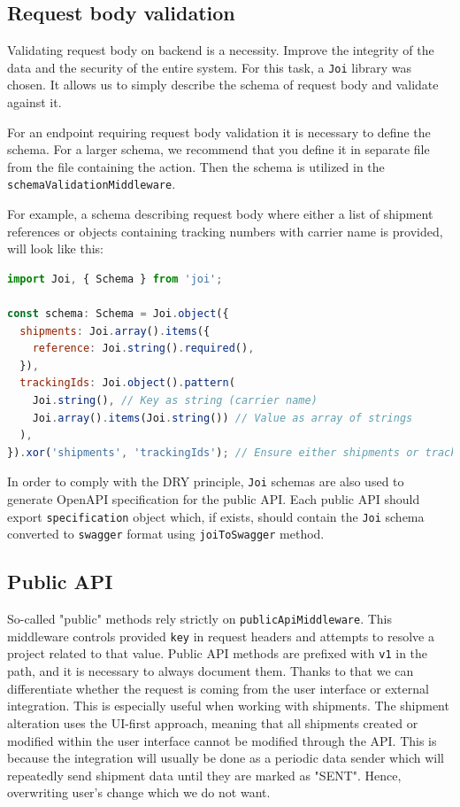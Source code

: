 \subsection{Request body validation}
Validating request body on backend is a necessity.
Improve the integrity of the data and the security of the entire system.
For this task, a \texttt{Joi} library was chosen.
It allows us to simply describe the schema of request body and validate against it.

For an endpoint requiring request body validation it is necessary to define the schema.
For a larger schema, we recommend that you define it in separate file from the file containing the action. 
Then the schema is utilized in the \texttt{schemaValidationMiddleware}.

For example, a schema describing request body where either a list of shipment references or objects containing tracking numbers with carrier name is provided, will look like this:

\begin{lstlisting}[language=JavaScript,caption={Joi schema example}]
import Joi, { Schema } from 'joi';

const schema: Schema = Joi.object({
  shipments: Joi.array().items({
    reference: Joi.string().required(),
  }),
  trackingIds: Joi.object().pattern(
    Joi.string(), // Key as string (carrier name)
    Joi.array().items(Joi.string()) // Value as array of strings
  ),
}).xor('shipments', 'trackingIds'); // Ensure either shipments or trackingIds is provided, but not both
\end{lstlisting}

In order to comply with the DRY principle, \texttt{Joi} schemas are also used to generate OpenAPI specification for the public API.
Each public API should export \texttt{specification} object which, if exists, should contain the \texttt{Joi} schema converted to \texttt{swagger} format using \texttt{joiToSwagger} method.

\subsection{Public API}
So-called "public" methods rely strictly on \texttt{publicApiMiddleware}.
This middleware controls provided \texttt{key} in request headers and attempts to resolve a project related to that value. 
Public API methods are prefixed with \texttt{v1} in the path, and it is necessary to always document them.
Thanks to that we can differentiate whether the request is coming from the user interface or external integration.
This is especially useful when working with shipments.
The shipment alteration uses the UI-first approach, meaning that all shipments created or modified within the user interface cannot be modified through the API.
This is because the integration will usually be done as a periodic data sender which will repeatedly send shipment data until they are marked as "SENT". 
Hence, overwriting user's change which we do not want.


